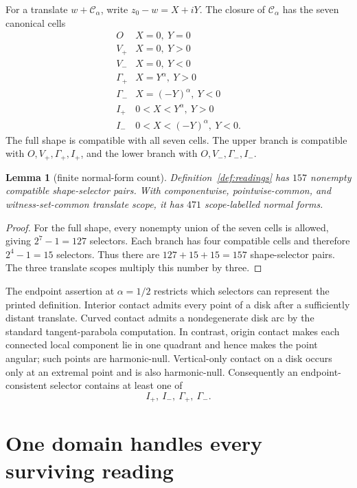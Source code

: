 \documentclass[10pt,reqno]{amsart}
\newtheorem{lemma}[theorem]{Lemma}
\theoremstyle{definition}
\newcommand{\cC}{\mathcal C}
\begin{document}
For a translate \(w+\cC_\alpha\), write
\(z_0-w=X+iY\).  The closure of \(\cC_\alpha\) has the seven canonical
cells
\[
\begin{array}{c|c}
 O&X=0,\ Y=0\\
 V_+&X=0,\ Y>0\\
 V_-&X=0,\ Y<0\\
 \Gamma_+&X=Y^\alpha,\ Y>0\\
 \Gamma_-&X=(-Y)^\alpha,\ Y<0\\
 I_+&0<X<Y^\alpha,\ Y>0\\
 I_-&0<X<(-Y)^\alpha,\ Y<0.
\end{array}
\tag{4.1}\label{eq:cells}
\]
The full shape is compatible with all seven cells.  The upper branch is
compatible with \(O,V_+,\Gamma_+,I_+\), and the lower branch with
\(O,V_-,\Gamma_-,I_-\).

\begin{lemma}[finite normal-form count]\label{lem:count}
Definition~\ref{def:readings} has \(157\) nonempty compatible
shape-selector pairs.  With componentwise, pointwise-common, and
witness-set-common translate scope, it has \(471\) scope-labelled normal
forms.
\end{lemma}

\begin{proof}
For the full shape, every nonempty union of the seven cells is allowed,
giving \(2^7-1=127\) selectors.  Each branch has four compatible cells and
therefore \(2^4-1=15\) selectors.  Thus there are
\(127+15+15=157\) shape-selector pairs.  The three translate scopes multiply
this number by three.
\end{proof}

The endpoint assertion at \(\alpha=1/2\) restricts which selectors can
represent the printed definition.  Interior contact admits every point of a
disk after a sufficiently distant translate.  Curved contact admits a
nondegenerate disk arc by the standard tangent-parabola computation.  In
contrast, origin contact makes each connected local component lie in one
quadrant and hence makes the point angular; such points are harmonic-null.
Vertical-only contact on a disk occurs only at an extremal point and is also
harmonic-null.  Consequently an endpoint-consistent selector contains at
least one of
\[
 I_+,\ I_-,\ \Gamma_+,\ \Gamma_-.
\tag{4.2}\label{eq:survivors}
\]

\section{One domain handles every surviving reading}
\end{document}

